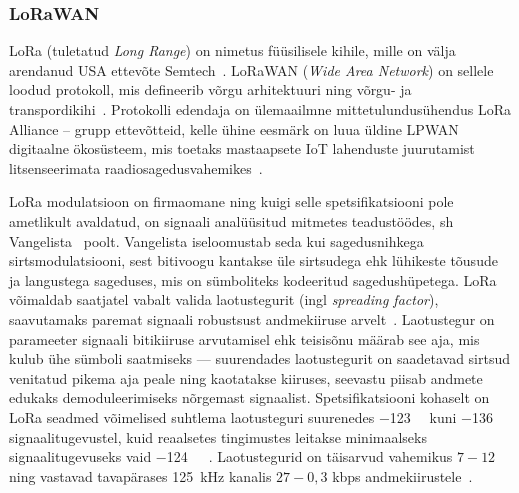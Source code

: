 \documentclass[12pt]{article}
\begin{document}
    \subsubsection{LoRaWAN}

    LoRa (tuletatud \textit{Long Range}) on nimetus füüsilisele kihile, mille on välja arendanud USA ettevõte Semtech~\cite{loraIntro}.
    LoRaWAN (\textit{Wide Area Network}) on sellele loodud protokoll, mis defineerib võrgu arhitektuuri ning võrgu- ja transpordikihi~\cite{lorawanIntro}.
    Protokolli edendaja on ülemaailmne mittetulundusühendus LoRa Alliance -- grupp ettevõtteid, kelle ühine eesmärk on luua üldine LPWAN digitaalne ökosüsteem, mis toetaks mastaapsete IoT lahenduste juurutamist litsenseerimata raadiosagedusvahemikes~\cite{loraalliance}.

    LoRa modulatsioon on firmaomane ning kuigi selle spetsifikatsiooni pole ametlikult avaldatud, on signaali analüüsitud mitmetes teadustöödes, sh Vangelista~\cite{vangelista} poolt.
    Vangelista iseloomustab seda kui sagedusnihkega sirtsmodulatsiooni, sest bitivoogu kantakse üle sirtsudega ehk lühikeste tõusude ja langustega sageduses, mis on sümboliteks kodeeritud sagedushüpetega.
    LoRa võimaldab saatjatel vabalt valida laotustegurit (ingl \textit{spreading factor}), saavutamaks paremat signaali robustsust andmekiiruse arvelt~\cite{loramodulation}.
    Laotustegur on parameeter signaali bitikiiruse arvutamisel ehk teisisõnu määrab see aja, mis kulub ühe sümboli saatmiseks — suurendades laotustegurit on saadetavad sirtsud venitatud pikema aja peale ning kaotatakse kiiruses, seevastu piisab andmete edukaks demoduleerimiseks nõrgemast signaalist.
    Spetsifikatsiooni kohaselt on LoRa seadmed võimelised suhtlema laotusteguri suurenedes \SI{-123}{\deci\belm} kuni \SI{-136}{\deci\belm} signaalitugevustel, kuid reaalsetes tingimustes leitakse minimaalseks signaalitugevuseks vaid \SI{-124}{\deci\belm}~\cite{augustin2016study}.
    Laotustegurid on täisarvud vahemikus $7-12$ ning vastavad tavapärases \SI{125}{\kilo\hertz} kanalis $27-0{,}3$ kbps andmekiirustele~\cite{adelanto}.
\end{document}
